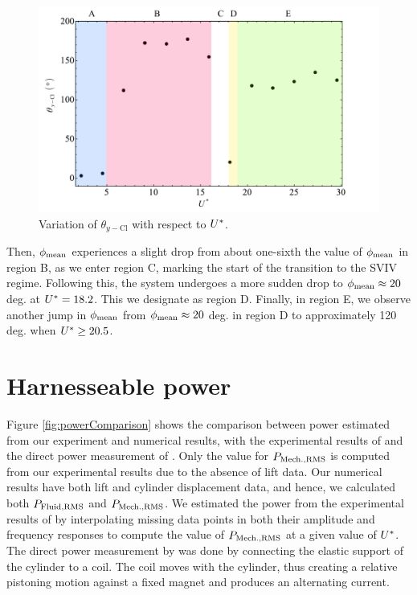 \documentclass[oneside]{utmthesis}
\begin{document}
\begin{figure}
  \centering
  \includegraphics[width=1\textwidth]{figs/phaseAngleRegime}
  \caption{Variation of $\theta_{y-\text{Cl}}$ with respect to $U^{*}$.}
  \label{fig:phaseAngleRegime}
\end{figure}

Then, $\phi_{\text{mean}}$ experiences a slight drop from about one-sixth the value of $\phi_{\text{mean}}$ in region B, as we enter region C, marking the start of the transition to the SVIV regime. Following this, the system undergoes a more sudden drop to $\phi_{\text{mean}} \approx 20$ deg. at $U^{*} = 18.2$. This we designate as region D. Finally, in region E, we observe another jump in $\phi_{\text{mean}}$ from $\phi_{\text{mean}} \approx 20$ deg. in region D to approximately 120 deg. when $U^{*} \geq 20.5$.

\section{Harnesseable power} \label{sec:mathModel}
Figure \ref{fig:powerComparison} shows the comparison between power estimated from our experiment and numerical results, with the experimental results of \citet{Nguyen2012} and the direct power measurement of \citet{Koide2013}. Only the value for $P_{\text{Mech.,RMS}}$ is computed from our experimental results due to the absence of lift data. Our numerical results have both lift and cylinder displacement data, and hence, we calculated both $P_{\text{Fluid,RMS}}$ and $P_{\text{Mech.,RMS}}$. We estimated the power from the experimental results of \citet{Nguyen2012} by interpolating missing data points in both their amplitude and frequency responses to compute the value of $P_{\text{Mech.,RMS}}$ at a given value of $U^{*}$. The direct power measurement by \citet{Koide2013} was done by connecting the elastic support of the cylinder to a coil. The coil moves with the cylinder, thus creating a relative pistoning motion against a fixed magnet and produces an alternating current.
\end{document}
